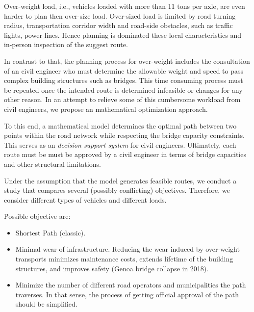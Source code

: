 

Over-weight load, i.e., vehicles loaded with more than 11 tons per axle,
are even harder to plan then over-size load. Over-sized load is limited
by road turning radius, transportation corridor width and road-side obstacles, such as traffic lights, power lines. Hence planning is dominated these local characteristics
and in-person inspection of the suggest route.

In contrast to that, the planning process for over-weight includes the consultation
of an civil engineer who must determine the allowable weight and speed to pass
complex building structures such as bridges.
This time consuming process must be repeated once the intended route is determined infeasible or changes for any other reason.
In an attempt to relieve some of this cumbersome workload from civil engineers,
we propose an mathematical optimization approach.

To this end, a mathematical model determines the optimal path between two
points within the road network while respecting the bridge capacity constraints.
This serves as an \textit{decision support system} for civil engineers.
Ultimately,  each route must be must be approved by a civil engineer  in terms of
bridge capacities and other structural limitations.

Under the assumption that the model generates feasible routes,
we conduct a study that compares several (possibly conflicting) objectives.
Therefore, we consider different types of vehicles and different loads.

Possible objective are:
\begin{itemize}
  \item Shortest Path (classic).

  \item Minimal wear of infrastructure. Reducing the wear induced by over-weight transports
  minimizes maintenance costs, extends lifetime of the building structures, and
  improves safety (Genoa bridge collapse in 2018).

  \item Minimize the number of different road operators and municipalities the path
  traverses. In that sense, the process of getting official approval of the
  path should be simplified.
\end{itemize}

